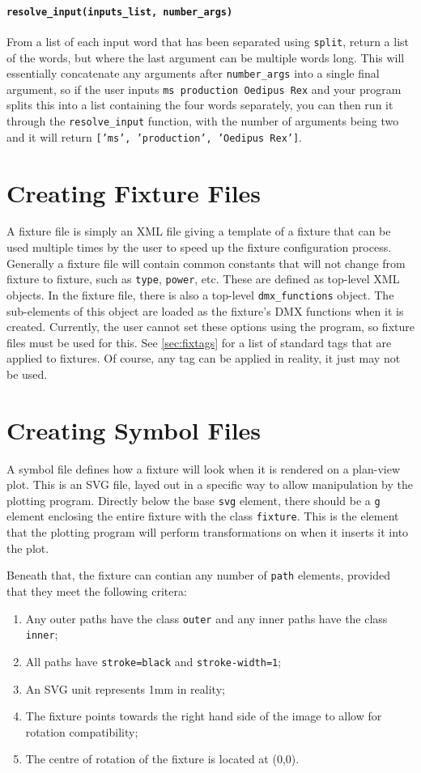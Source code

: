 \documentclass[a4paper]{article}
\begin{document}
\paragraph{\texttt{resolve\_input(inputs\_list, number\_args)}}
From a list of each input word that has been separated using \texttt{split}, 
return a list of the words, but where the last argument can be multiple words 
long. This will essentially concatenate any arguments after 
\texttt{number\_args} into a single final argument, so if the user inputs 
\texttt{ms production Oedipus Rex} and your program splits this into a list 
containing the four words separately, you can then run it through the 
\texttt{resolve\_input} function, with the number of arguments being two and 
it will return \texttt{['ms', 'production', 'Oedipus Rex']}.

\section{Creating Fixture Files}
A fixture file is simply an XML file giving a template of a fixture that can 
be used multiple times by the user to speed up the fixture configuration 
process. Generally a fixture file will contain common constants that will not 
change from fixture to fixture, such as \texttt{type}, \texttt{power}, etc. 
These are defined as top-level XML objects. In the fixture file, there is also 
a top-level \texttt{dmx\_functions} object. The sub-elements of this object 
are loaded as the fixture's DMX functions when it is created. Currently, the 
user cannot set these options using the program, so fixture files must be 
used for this. See \autoref{sec:fixtags} for a list of standard tags that 
are applied to fixtures. Of course, any tag can be applied in reality, it 
just may not be used.

\section{Creating Symbol Files}
A symbol file defines how a fixture will look when it is rendered on a 
plan-view plot. This is an SVG file, layed out in a specific way to allow 
manipulation by the plotting program. Directly below the base \texttt{svg} 
element, there should be a \texttt{g} element enclosing the entire fixture 
with the class \texttt{fixture}. This is the element that the plotting 
program will perform transformations on when it inserts it into the plot. 

Beneath that, the fixture can contian any number of \texttt{path} elements, 
provided that they meet the following critera:
\begin{enumerate}
\item Any outer paths have the class \texttt{outer} and any inner paths have 
the class \texttt{inner};
\item All paths have \texttt{stroke=black} and \texttt{stroke-width=1};
\item An SVG unit represents 1mm in reality;
\item The fixture points towards the right hand side of the image to allow for 
rotation compatibility;
\item The centre of rotation of the fixture is located at (0,0).
\end{enumerate}
\end{document}
